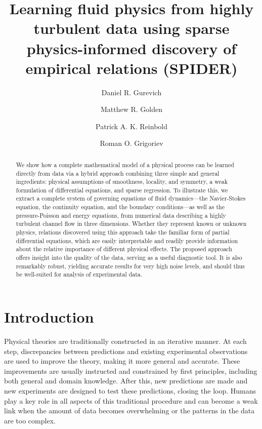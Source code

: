 \documentclass[preprint]{article}
\title{Learning fluid physics from highly turbulent data using sparse physics-informed discovery of empirical relations (SPIDER)}
\author[1]{Daniel R. Gurevich}
\author[2]{Matthew R. Golden}
\author[2]{Patrick A. K. Reinbold}
\author[2]{Roman O. Grigoriev}
\affil[1]{Program in Applied and Computational Mathematics, Princeton University, Princeton, NJ 08544}
\affil[2]{{School of Physics, Georgia Institute of Technology, Atlanta, GA 30332}}
\def\bi#1{\textbf{#1}}
\begin{document}
\maketitle

\begin{abstract}
We show how a complete mathematical model of a physical process can be learned directly from data via a hybrid approach combining three simple and general ingredients: physical assumptions of smoothness, locality, and symmetry, a weak formulation of differential equations, and sparse regression. To illustrate this, we extract a complete system of governing equations of fluid dynamics---the Navier-Stokes equation, the continuity equation, and the boundary conditions---as well as the pressure-Poisson and energy equations, from numerical data describing a highly turbulent channel flow in three dimensions. Whether they represent known or unknown physics, relations discovered using this approach take the familiar form of partial differential equations, which are easily interpretable and readily provide information about the relative importance of different physical effects. The proposed approach offers insight into the quality of the data, serving as a useful diagnostic tool. It is also remarkably robust, yielding accurate results for very high noise levels, and should thus be well-suited for analysis of experimental data.
\end{abstract}




\section{Introduction}

Physical theories are traditionally constructed in an iterative manner. At each step, discrepancies between predictions and existing experimental observations are used to improve the theory, making it more general and accurate. These improvements are usually instructed and constrained by first principles, including both general and domain knowledge. After this, new predictions are made and new experiments are designed to test these predictions, closing the loop. Humans play a key role in all aspects of this traditional procedure and can become a weak link when the amount of data becomes overwhelming or the patterns in the data are too complex. 
\end{document}
